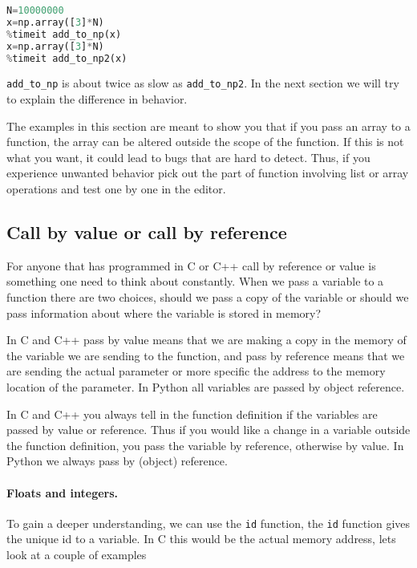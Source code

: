 \documentclass[graybox,sectrefs,envcountresetchap,open=right,final]{svmonodo}
\newenvironment{graybox2admon}[1][]{
\begin{graybox2mdframed}[frametitle=#1]
}
{
\end{graybox2mdframed}
}
\begin{document}
\begin{lstlisting}[language=python,style=blue1bar]
N=10000000
x=np.array([3]*N)
%timeit add_to_np(x)
x=np.array([3]*N)
%timeit add_to_np2(x)

\end{lstlisting}

\Verb!add_to_np! is about twice as slow as \Verb!add_to_np2!. In the next section we will try to explain the difference in behavior.



\begin{graybox2admon}[Avoiding unwanted behavior of functions]
The examples in this section are meant to show you that if you pass an array to a function, the array can be altered outside the scope of the function. If this is not what you want, it could lead to bugs that are hard to detect. Thus, if you experience unwanted behavior pick out the part of function involving list or array operations and test one by one in the editor.
\end{graybox2admon}




\subsection{Call by value or call by reference}
For anyone that has programmed in C or C++ call by reference or value is something one need to think about constantly. When we pass a variable to a function there are two choices, should we pass a copy of the variable or should we pass information about where the variable is stored in memory?


\begin{graybox2admon}[Value and reference]
In C and C++ pass by value means that we are making a copy in the memory of the variable we are sending to the function, and pass by reference means that we are sending the actual parameter or more specific the address to the memory location of the parameter. In Python all variables are passed by object reference.
\end{graybox2admon}



In C and C++ you always tell in the function definition if the variables are passed by value or reference. Thus if you would like a change in a variable outside the function definition, you pass the variable by reference, otherwise by value. In Python we always pass by (object) reference.

\paragraph{Floats and integers.}
To gain a deeper understanding, we can use the \texttt{id} function, the \texttt{id} function gives the unique id to a variable. In C this would be the actual memory address, lets look at a couple of examples
\end{document}
